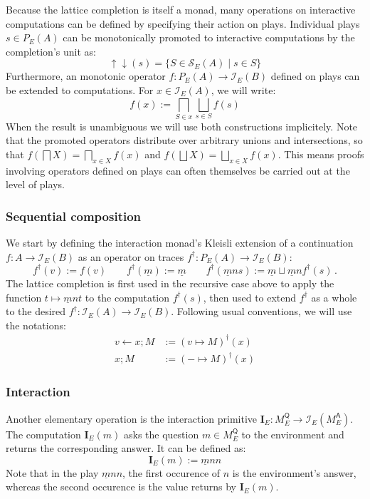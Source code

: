 \documentclass[format=sigplan,authordraft]{acmart}
\newcommand{\kw}[1]{\ensuremath{\mathsf{#1}}}
\begin{document}
Because the lattice completion is itself a monad,
many operations on interactive computations
can be defined by specifying their action on plays.
Individual plays $s \in P_E(A)$ can be monotonically promoted to
interactive computations by the completion's unit as:
\[
    {\uparrow \downarrow}(s) =
      \{ S \in \mathcal{S}_E(A) \mid s \in S \}
\]
Furthermore,
an monotonic operator $f : P_E(A) \rightarrow \mathcal{I}_E(B)$
defined on plays can be extended to computations.
For $x \in \mathcal{I}_E(A)$, we will write:
\[
  f(x) := \bigsqcap_{S \in x} \bigsqcup_{s \in S} f(s)
\]
When the result is unambiguous we will use both constructions
implicitely.
Note that the promoted operators
distribute over arbitrary unions and intersections, so that
$f(\bigsqcap X) = \bigsqcap_{x \in X} f(x)$ and
$f(\bigsqcup X) = \bigsqcup_{x \in X} f(x)$.
This means proofs involving operators defined on plays
can often themselves be carried out at the level of plays.

\subsubsection{Sequential composition}

We start by defining the interaction monad's Kleisli extension
of a continuation $f : A \rightarrow \mathcal{I}_E(B)$
as an operator on traces
$f^\dagger : P_E(A) \rightarrow \mathcal{I}_E(B)$:
\[
  f^\dagger(v) := f(v) \qquad
  f^\dagger(\underline{m}) := \underline{m} \qquad
  f^\dagger(\underline{m} n s) :=
    \underline{m} \sqcup \underline{m} n f^\dagger(s) \,.
\]
The lattice completion is first used in the recursive case above
to apply the function $t \mapsto \underline{m} n t$
to the computation $f^\dagger(s)$,
then used to extend $f^\dagger$ as a whole to the desired
$f^\dagger : \mathcal{I}_E(A) \rightarrow \mathcal{I}_E(B)$.
Following usual conventions, we will use the notations:
\begin{align*}
  v \leftarrow x ; M &:= (v \mapsto M)^\dagger(x) \\
  x ; M &:= ({-} \mapsto M)^\dagger(x)
\end{align*}

\subsubsection{Interaction}

Another elementary operation
is the interaction primitive
$\mathbf{I}_E : M_E^\kw{Q} \rightarrow \mathcal{I}_E(M_E^\kw{A})$.
The computation $\mathbf{I}_E(m)$
asks the question $m \in M_E^\kw{Q}$ to the environment
and returns the corresponding answer.
It can be defined as:
\[
    \mathbf{I}_E(m) := \underline{m} n n 
\]
Note that in the play $\underline{m} n n$,
the first occurence of $n$ is the environment's answer,
whereas the second occurence is the value returns by $\mathbf{I}_E(m)$.
\end{document}
